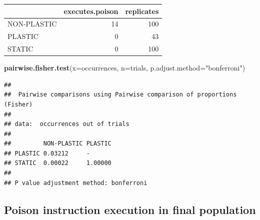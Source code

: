 \documentclass[]{book}
\newenvironment{Shaded}{\begin{snugshade}}{\end{snugshade}}
\newcommand{\DataTypeTok}[1]{\textcolor[rgb]{0.13,0.29,0.53}{#1}}
\newcommand{\KeywordTok}[1]{\textcolor[rgb]{0.13,0.29,0.53}{\textbf{#1}}}
\newcommand{\NormalTok}[1]{#1}
\newcommand{\StringTok}[1]{\textcolor[rgb]{0.31,0.60,0.02}{#1}}
\begin{document}
\begin{tabular}{l|r|r}
\hline
  & executes.poison & replicates\\
\hline
NON-PLASTIC & 14 & 100\\
\hline
PLASTIC & 0 & 43\\
\hline
STATIC & 0 & 100\\
\hline
\end{tabular}

\begin{Shaded}
\begin{Highlighting}[]
\KeywordTok{pairwise.fisher.test}\NormalTok{(}\DataTypeTok{x=}\NormalTok{occurrences, }\DataTypeTok{n=}\NormalTok{trials, }\DataTypeTok{p.adjust.method=}\StringTok{"bonferroni"}\NormalTok{)}
\end{Highlighting}
\end{Shaded}

\begin{verbatim}
## 
##  Pairwise comparisons using Pairwise comparison of proportions (Fisher) 
## 
## data:  occurrences out of trials 
## 
##         NON-PLASTIC PLASTIC
## PLASTIC 0.03212     -      
## STATIC  0.00022     1.00000
## 
## P value adjustment method: bonferroni
\end{verbatim}

\hypertarget{poison-instruction-execution-in-final-population}{%
\subsection{Poison instruction execution in final population}\label{poison-instruction-execution-in-final-population}}
\end{document}

